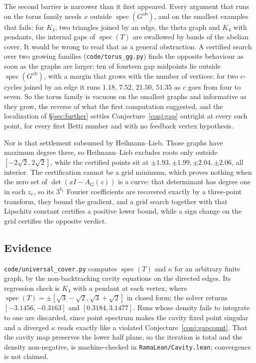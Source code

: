 \documentclass[11pt]{article}
\theoremstyle{remark}
\begin{document}
The second barrier is narrower than it first appeared. Every argument that runs on the torus family needs $x$ outside
$\operatorname{spec}(G^{\mathrm{ab}})$, and on the smallest examples that fails: for $K_4$,
two triangles joined by an edge, the theta graph and $K_4$ with pendants, the internal gaps
of $\operatorname{spec}(T)$ are swallowed by bands of the abelian cover. It would be wrong to
read that as a general obstruction. A certified search over two growing families
(\texttt{code/torus\_gg.py}) finds the opposite behaviour as soon as the graphs are larger:
ten of fourteen gap midpoints lie outside $\operatorname{spec}(G^{\mathrm{ab}})$, with a
margin that grows with the number of vertices: for two $c$-cycles joined by an edge it runs
$1.18,\,7.52,\,21.50,\,51.35$ as $c$ goes from four to seven. So the torus family is vacuous
on the smallest graphs and informative as they grow, the reverse of what the first
computation suggested, and the localization of \S\ref{sec:further} settles
Conjecture~\ref{conj:gap} outright at every such point, for every first Betti number and with
no feedback vertex hypothesis.

Nor is that settlement subsumed by Heilmann--Lieb. Those graphs have maximum degree three, so
Heilmann--Lieb excludes roots only outside $[-2\sqrt2,2\sqrt2]$, while the certified points
sit at $\pm1.93,\pm1.99,\pm2.04,\pm2.06$, all interior. The certification cannot be a grid
minimum, which proves nothing when the zero set of $\det(xI-A_G(z))$ is a curve: that
determinant has degree one in each $z_e$, so its $3^{b_1}$ Fourier coefficients are recovered
exactly by a three-point transform, they bound the gradient, and a grid search together with
that Lipschitz constant certifies a positive lower bound, while a sign change on the grid
certifies the opposite verdict.

\subsection{Evidence}

\texttt{code/universal\_cover.py} computes $\operatorname{spec}(T)$ and $\kappa$ for an
arbitrary finite graph, by the non-backtracking cavity equations on the directed edges. Its
regression check is $K_4$ with a pendant at each vertex, where
$\operatorname{spec}(T)=\pm[\sqrt3-\sqrt2,\sqrt3+\sqrt2]$ in closed form; the solver returns
$[-3.1456,-0.3163]$ and $[0.3184,3.1477]$. Runs whose density fails to integrate to one are
discarded, since point spectrum makes the cavity fixed point singular and a diverged
$\kappa$ reads exactly like a violated Conjecture~\ref{conj:gapcount}. That the cavity map
preserves the lower half plane, so the iteration is total and the density non-negative, is
machine-checked in \texttt{RamaLean/Cavity.lean}; convergence is not claimed.
\end{document}
